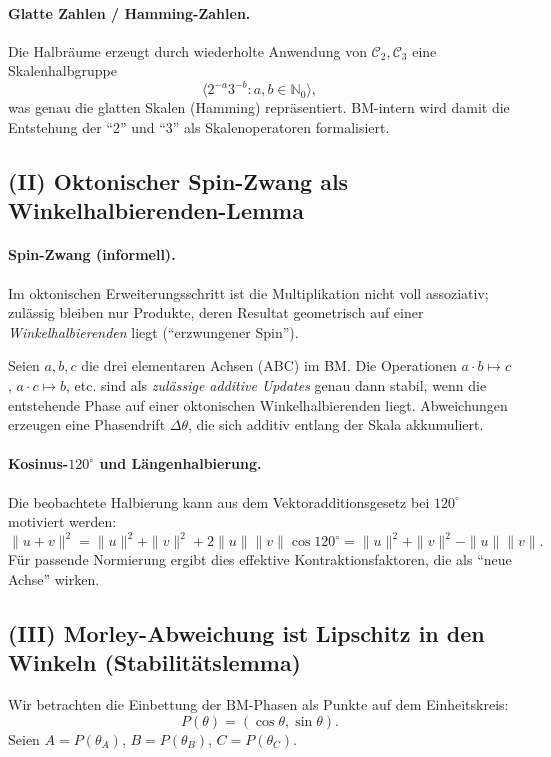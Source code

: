 \paragraph{Glatte Zahlen / Hamming-Zahlen.}
Die Halbr\"aume erzeugt durch wiederholte Anwendung von $\mathcal C_2,\mathcal C_3$ eine Skalenhalbgruppe
\[
\langle 2^{-a}3^{-b} : a,b\in\mathbb N_0\rangle,
\]
was genau die glatten Skalen (Hamming) repr\"asentiert.
BM-intern wird damit die Entstehung der ``2'' und ``3'' als Skalenoperatoren formalisiert.

\subsection{(II) Oktonischer Spin-Zwang als Winkelhalbierenden-Lemma}
\paragraph{Spin-Zwang (informell).}
Im oktonischen Erweiterungsschritt ist die Multiplikation nicht voll assoziativ; zul\"assig bleiben nur Produkte, deren
Resultat geometrisch auf einer \emph{Winkelhalbierenden} liegt (``erzwungener Spin'').

\begin{lemma}
Seien $a,b,c$ die drei elementaren Achsen (ABC) im BM. Die Operationen $a\cdot b\mapsto c$, $a\cdot c\mapsto b$, etc.
sind als \emph{zul\"assige additive Updates} genau dann stabil, wenn die entstehende Phase
auf einer oktonischen Winkelhalbierenden liegt. Abweichungen erzeugen eine Phasendrift $\Delta\theta$,
die sich additiv entlang der Skala akkumuliert.
\end{lemma}

\paragraph{Kosinus-$120^\circ$ und L\"angenhalbierung.}
Die beobachtete Halbierung kann aus dem Vektoradditionsgesetz bei $120^\circ$ motiviert werden:
\[
\|u+v\|^2=\|u\|^2+\|v\|^2+2\|u\|\|v\|\cos 120^\circ
=\|u\|^2+\|v\|^2-\|u\|\|v\|.
\]
F\"ur passende Normierung ergibt dies effektive Kontraktionsfaktoren, die als ``neue Achse'' wirken.

\subsection{(III) Morley-Abweichung ist Lipschitz in den Winkeln (Stabilit\"atslemma)}
Wir betrachten die Einbettung der BM-Phasen als Punkte auf dem Einheitskreis:
\[
P(\theta)=(\cos\theta,\sin\theta).
\]
Seien $A=P(\theta_A)$, $B=P(\theta_B)$, $C=P(\theta_C)$.


